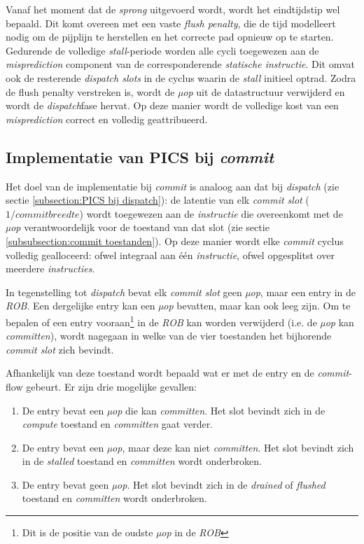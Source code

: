 \documentclass[12pt,a4paper,faculty=ea,language=nl]{ugent-doc}
\begin{document}
\begin{enumerate}
Vanaf het moment dat de \textit{sprong} uitgevoerd wordt, wordt het eindtijdstip wel bepaald. Dit komt overeen met een vaste \textit{flush penalty}, die de tijd modelleert nodig om de pijplijn te herstellen en het correcte pad opnieuw op te starten.
Gedurende de volledige \textit{stall}-periode worden alle cycli toegewezen aan de \textit{misprediction} component van de corresponderende \textit{statische instructie}. Dit omvat ook de resterende \textit{dispatch slots} in de cyclus waarin de \textit{stall} initieel optrad.
Zodra de flush penalty verstreken is, wordt de \textit{µop} uit de datastructuur verwijderd en wordt de \textit{dispatch}fase hervat.
Op deze manier wordt de volledige kost van een \textit{misprediction} correct en volledig geattribueerd.
\end{enumerate}

\subsection{Implementatie van PICS bij \textit{commit}}

Het doel van de implementatie bij \textit{commit} is analoog aan dat bij \textit{dispatch} (zie sectie \ref{subsection:PICS bij dispatch}): de latentie van elk \textit{commit slot} (\(1 / \textit{commitbreedte}\)) wordt toegewezen aan de \textit{instructie} die overeenkomt met de \textit{µop} verantwoordelijk voor de toestand van dat slot (zie sectie \ref{subsubsection:commit toestanden}).
Op deze manier wordt elke \textit{commit} cyclus volledig gealloceerd: ofwel integraal aan één \textit{instructie}, ofwel opgesplitst over meerdere \textit{instructies}.

In tegenstelling tot \textit{dispatch} bevat elk \textit{commit slot} geen \textit{µop}, maar een entry in de \textit{ROB}. Een dergelijke entry kan een \textit{µop} bevatten, maar kan ook leeg zijn.
Om te bepalen of een entry vooraan\footnote{Dit is de positie van de oudste \textit{µop} in de \textit{ROB}} in de \textit{ROB} kan worden verwijderd (i.e. de \textit{µop} kan \textit{committen}), wordt nagegaan in welke van de vier toestanden het bijhorende \textit{commit slot} zich bevindt.

Afhankelijk van deze toestand wordt bepaald wat er met de entry en de \textit{commit}-flow gebeurt. Er zijn drie mogelijke gevallen:
\begin{enumerate}
    \item De entry bevat een \textit{µop} die kan \textit{committen}. Het slot bevindt zich in de \textit{compute} toestand en \textit{committen} gaat verder.
    \item De entry bevat een \textit{µop}, maar deze kan niet \textit{committen}. Het slot bevindt zich in de \textit{stalled} toestand en \textit{committen} wordt onderbroken.
    \item De entry bevat geen \textit{µop}. Het slot bevindt zich in de \textit{drained} of \textit{flushed} toestand en \textit{committen} wordt onderbroken.
\end{enumerate}
\end{document}
